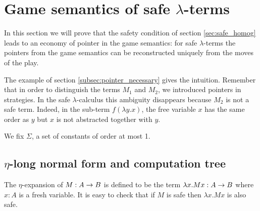 \def\cmptre#1{\tau(#1)}
\def\aux#1{\lceil #1\rceil}
\def\nf#1{\eta_{\sf nf}(#1)}

\section{Game semantics of safe $\lambda$-terms}

In this section we will prove that the safety condition
of section \ref{sec:safe_homog} leads to an economy of pointer in the game
semantics: for safe $\lambda$-terms the pointers from the game semantics can be reconstructed uniquely from the moves of
the play.

The example of section \ref{subsec:pointer_necessary} gives the
intuition. Remember that in order to distinguish the terms $M_1$ and
$M_2$, we introduced pointers in strategies. In the safe
$\lambda$-calculus this ambiguity disappears because $M_2$ is not a
safe term. Indeed, in the sub-term $f (\lambda y . x)$, the free
variable $x$ has the same order as $y$ but $x$ is not abstracted
together with $y$.

We fix $\Sigma$, a set of constants of order at most 1.
%
%






\subsection{$\eta$-long normal form and computation tree}

The $\eta$-expansion of $M: A\rightarrow B$ is defined to be the term $\lambda x . M x : A\rightarrow B$ where $x:A$ is a fresh variable.
It is easy to check that if $M$ is safe then $\lambda x . M x$ is also safe.

